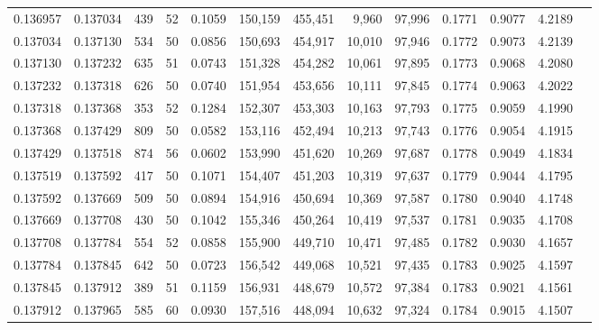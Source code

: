 \begin{tabular}{rrrrrrrrrrrrr}
0.136957 & 0.137034 &   439 &  52 &                                     0.1059 & 150,159 & 455,451 &   9,960 &  97,996 & 0.1771 & 0.9077 & 4.2189 \\
0.137034 & 0.137130 &   534 &  50 &                                     0.0856 & 150,693 & 454,917 &  10,010 &  97,946 & 0.1772 & 0.9073 & 4.2139 \\
0.137130 & 0.137232 &   635 &  51 &                                     0.0743 & 151,328 & 454,282 &  10,061 &  97,895 & 0.1773 & 0.9068 & 4.2080 \\
0.137232 & 0.137318 &   626 &  50 &                                     0.0740 & 151,954 & 453,656 &  10,111 &  97,845 & 0.1774 & 0.9063 & 4.2022 \\
0.137318 & 0.137368 &   353 &  52 &                                     0.1284 & 152,307 & 453,303 &  10,163 &  97,793 & 0.1775 & 0.9059 & 4.1990 \\
0.137368 & 0.137429 &   809 &  50 &                                     0.0582 & 153,116 & 452,494 &  10,213 &  97,743 & 0.1776 & 0.9054 & 4.1915 \\
0.137429 & 0.137518 &   874 &  56 &                                     0.0602 & 153,990 & 451,620 &  10,269 &  97,687 & 0.1778 & 0.9049 & 4.1834 \\
0.137519 & 0.137592 &   417 &  50 &                                     0.1071 & 154,407 & 451,203 &  10,319 &  97,637 & 0.1779 & 0.9044 & 4.1795 \\
0.137592 & 0.137669 &   509 &  50 &                                     0.0894 & 154,916 & 450,694 &  10,369 &  97,587 & 0.1780 & 0.9040 & 4.1748 \\
0.137669 & 0.137708 &   430 &  50 &                                     0.1042 & 155,346 & 450,264 &  10,419 &  97,537 & 0.1781 & 0.9035 & 4.1708 \\
0.137708 & 0.137784 &   554 &  52 &                                     0.0858 & 155,900 & 449,710 &  10,471 &  97,485 & 0.1782 & 0.9030 & 4.1657 \\
0.137784 & 0.137845 &   642 &  50 &                                     0.0723 & 156,542 & 449,068 &  10,521 &  97,435 & 0.1783 & 0.9025 & 4.1597 \\
0.137845 & 0.137912 &   389 &  51 &                                     0.1159 & 156,931 & 448,679 &  10,572 &  97,384 & 0.1783 & 0.9021 & 4.1561 \\
0.137912 & 0.137965 &   585 &  60 &                                     0.0930 & 157,516 & 448,094 &  10,632 &  97,324 & 0.1784 & 0.9015 & 4.1507 \\

\end{tabular}
